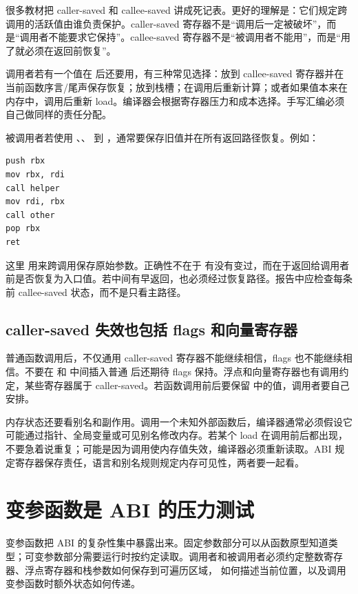 很多教材把 caller-saved 和 callee-saved 讲成死记表。更好的理解是：它们规定跨调用的活跃值由谁负责保护。caller-saved 寄存器不是“调用后一定被破坏”，而是“调用者不能要求它保持”。callee-saved 寄存器不是“被调用者不能用”，而是“用了就必须在返回前恢复”。

调用者若有一个值在  后还要用，有三种常见选择：放到 callee-saved 寄存器并在当前函数序言/尾声保存恢复；放到栈槽；在调用后重新计算；或者如果值本来在内存中，调用后重新 load。编译器会根据寄存器压力和成本选择。手写汇编必须自己做同样的责任分配。

被调用者若使用 、、 到 ，通常要保存旧值并在所有返回路径恢复。例如：

\begin{lstlisting}
push rbx
mov rbx, rdi
call helper
mov rdi, rbx
call other
pop rbx
ret
\end{lstlisting}

这里  用来跨调用保存原始参数。正确性不在于  有没有变过，而在于返回给调用者前是否恢复为入口值。若中间有早返回，也必须经过恢复路径。报告中应检查每条  前 callee-saved 状态，而不是只看主路径。

\subsection{caller-saved 失效也包括 flags 和向量寄存器}

普通函数调用后，不仅通用 caller-saved 寄存器不能继续相信，flags 也不能继续相信。不要在  和  中间插入普通  后还期待 flags 保持。浮点和向量寄存器也有调用约定，某些寄存器属于 caller-saved。若函数调用前后要保留  中的值，调用者要自己安排。

内存状态还要看别名和副作用。调用一个未知外部函数后，编译器通常必须假设它可能通过指针、全局变量或可见别名修改内存。若某个 load 在调用前后都出现，不要急着说重复；可能是因为调用使内存值失效，编译器必须重新读取。ABI 规定寄存器保存责任，语言和别名规则规定内存可见性，两者要一起看。

\section{变参函数是 ABI 的压力测试}

变参函数把 ABI 的复杂性集中暴露出来。固定参数部分可以从函数原型知道类型；可变参数部分需要运行时按约定读取。调用者和被调用者必须约定整数寄存器、浮点寄存器和栈参数如何保存到可遍历区域， 如何描述当前位置，以及调用变参函数时额外状态如何传递。

